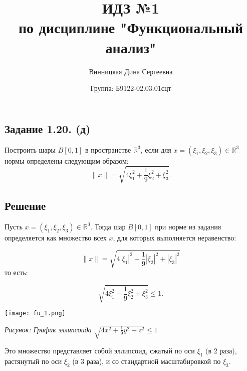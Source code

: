 \documentclass{article}
\title{\textbf{ИДЗ №1 \\ по дисциплине "Функциональный анализ"}}
\author{Винницкая Дина Сергеевна}
\date{Группа: Б9122-02.03.01сцт}
\begin{document}
	
	\maketitle

\subsection{Задание 1.20. (д)} Построить шары $B[0, 1]$ в пространстве $\mathbb{R}^3$, если для $x = (\xi_1, \xi_2, \xi_3) \in \mathbb{R}^3$ нормы определены следующим образом:
 $$\|x\| = \sqrt{4\xi_1^2 + \dfrac{1}{9}\xi_2^2 + \xi_3^2}.$$


\subsection{Решение}

Пусть \( x = (\xi_1, \xi_2, \xi_3) \in \mathbb{R}^3 \). Тогда шар \( B[0,1] \) при норме из задания определяется как множество всех \( x \), для которых выполняется неравенство:

\[
\|x\| = \sqrt{4|\xi_1|^2 + \frac{1}{9}|\xi_2|^2 + |\xi_3|^2}
\]
то есть:

\[
\sqrt{4\xi_1^2 + \frac{1}{9}\xi_2^2 + \xi_3^2} \leq 1.
\]
\begin{center}
    \texttt{[image: fu\_1.png]}
    
    \textit{Рисунок: График эллипсоида $\sqrt{4x^2 + \frac{1}{9}y^2 + z^2} \leq 1$}
\end{center}
Это множество представляет собой эллипсоид, сжатый по оси $\xi_1$ (в 2 раза), растянутый по оси $\xi_2$ (в 3 раза), и со стандартной масштабировкой по $\xi_3$.
\end{document}
